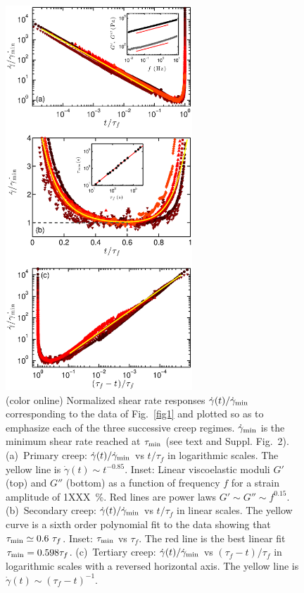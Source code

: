 \documentclass[twocolumn,superscriptaddress,showpacs,preprintnumbers,amsmath,amssymb,prl]{revtex4}
\newcommand\gp{\dot\gamma}
\newcommand\gpm{\dot\gamma_{\rm min}}
\newcommand\taum{\tau_{\rm min}}
\begin{document}
\begin{figure}
\centering
\includegraphics[width=7cm,clip]{Fig2.eps}
\caption{(color online) Normalized shear rate responses $\gp(t)/\gpm$ corresponding to the data of Fig.~\ref{fig1} and plotted so as to emphasize each of the three successive creep regimes. $\gpm$ is the minimum shear rate reached at $\taum$ (see text and Suppl. Fig.~2). (a)~Primary creep: $\gp(t)/\gpm$ vs $t/\tau_f$ in logarithmic scales. The yellow line is $\gp(t)\sim t^{-0.85}$. Inset: Linear viscoelastic moduli $G'$ (top) and $G''$ (bottom) as a function of frequency $f$ for a strain amplitude of 1XXX~\%. Red lines are power laws $G'\sim G''\sim f^{0.15}$. (b)~Secondary creep: $\gp(t)/\gpm$ vs $t/\tau_f$ in linear scales. The yellow curve is a sixth order polynomial fit to the data showing that $\taum\simeq 0.6~\tau_f$. Inset: $\taum$ vs $\tau_f$. The red line is the best linear fit $\taum=0.598\tau_f$. (c)~Tertiary creep: $\gp(t)/\gpm$ vs $(\tau_f-t)/\tau_f$ in logarithmic scales with a reversed horizontal axis. The yellow line is $\gp(t)\sim (\tau_f-t)^{-1}$. 
\label{fig2}}
\end{figure} 
\end{document}

